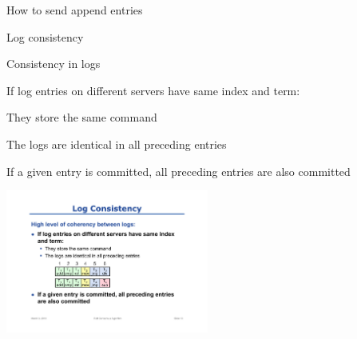 \begin{frame}{How to send append entries}

{
\setlength{\interspacetitleruled}{0pt}%
\setlength{\algotitleheightrule}{0pt}%
\begin{Procedure}
\end{Procedure}
}
\end{frame}

\begin{frame}{Log consistency}

\begin{block}{Consistency in logs}
\BIL
\item If log entries on different servers have same index and term:
\BI
\item They store the same command
\item The logs are identical in all preceding entries
\EI
\item If a given entry is committed, all preceding entries are also committed
\EIL
\end{block}

\smallskip
\begin{center}
\includegraphics[width=0.5\textwidth]{log-consistency}
\end{center}


\end{frame}




